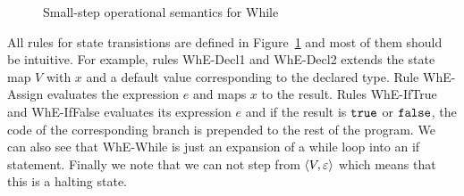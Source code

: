 \begin{figure}[h]
  \centering
  
  \RuleSpace

  
  \RuleSpace


  \RuleSpace


  \RuleSpace

  { \: \rightarrow \: }

  \RuleSpace 

  { \: \rightarrow \: }
  
  \RuleSpace


  \caption{Small-step operational semantics for While}
  \label{fig:while_sos}
\end{figure}

All rules for state transistions are defined in Figure~\ref{fig:while_sos} and
most of them should be intuitive. For example, rules {\sc WhE-Decl1} and {\sc
WhE-Decl2} extends the state map $V$ with $x$ and a default value corresponding
to the declared type. Rule {\sc WhE-Assign} evaluates the expression $e$ and
maps $x$ to the result. Rules {\sc WhE-IfTrue} and {\sc WhE-IfFalse} evaluates
its expression $e$ and if the result is $\mbox{\texttt{true}}$ or $\mbox{\texttt{false}}$, the code of the
corresponding branch is prepended to the rest of the program. We can also see
that {\sc WhE-While} is just an expansion of a while loop into an if statement.
Finally we note that we can not step from $\langle V, \varepsilon \rangle$ which means
that this is a halting state.

